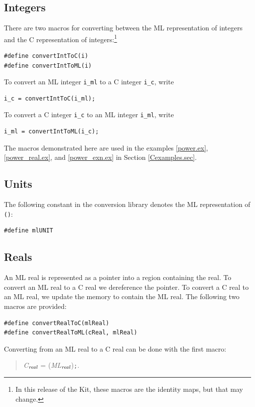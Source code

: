 \documentclass[12pt]{book}
\begin{document}
\subsection{Integers}
There are two macros for converting between the ML representation of
integers and the C representation of integers:\footnote{In this
release of the Kit, these macros are the identity maps, but that may
change.}
\begin{verbatim}
#define convertIntToC(i)
#define convertIntToML(i)
\end{verbatim}
To convert an ML integer \texttt{i\_ml} to a C integer \texttt{i\_c},
write 
\begin{verbatim}
i_c = convertIntToC(i_ml);
\end{verbatim}
To convert a C integer \texttt{i\_c} to an ML
 integer \texttt{i\_ml}, write 
\begin{verbatim}
i_ml = convertIntToML(i_c);
\end{verbatim}
The macros demonstrated here are used in the examples \ref{power.ex},
\ref{power_real.ex}, and \ref{power_exn.ex} in Section \ref{Cexamples.sec}.

\subsection{Units}
The following constant in the conversion library denotes the ML
representation of {\tt ()}:
\begin{verbatim}
#define mlUNIT
\end{verbatim}

\subsection{Reals}
An ML real is represented as a pointer into a region containing the
real. To convert an ML real to a C real we dereference the pointer. To
convert a C real to an ML real, we update the memory to contain the ML
real. The following two macros are provided:
\begin{verbatim}
#define convertRealToC(mlReal)
#define convertRealToML(cReal, mlReal)
\end{verbatim}

Converting from an ML real to a C real can be done with the first macro:
\begin{quote}
\emph{C}$_{\emph{real}}$ = (\emph{ML}$_{\emph{real}}$)\texttt{;}.
\end{quote}
\end{document}
